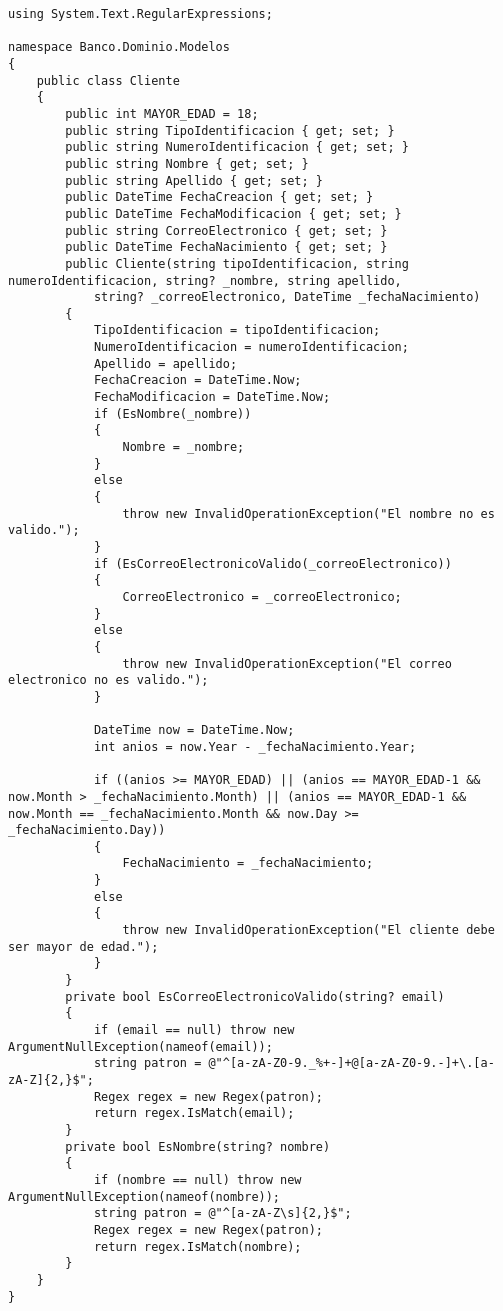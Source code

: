 \documentclass[executivepaper]{article}
\begin{document}
\begin{lstlisting}
using System.Text.RegularExpressions;

namespace Banco.Dominio.Modelos
{
    public class Cliente
    {
        public int MAYOR_EDAD = 18;
        public string TipoIdentificacion { get; set; }
        public string NumeroIdentificacion { get; set; }
        public string Nombre { get; set; }
        public string Apellido { get; set; }
        public DateTime FechaCreacion { get; set; }
        public DateTime FechaModificacion { get; set; }
        public string CorreoElectronico { get; set; }
        public DateTime FechaNacimiento { get; set; }
        public Cliente(string tipoIdentificacion, string numeroIdentificacion, string? _nombre, string apellido,
            string? _correoElectronico, DateTime _fechaNacimiento)
        {
            TipoIdentificacion = tipoIdentificacion;
            NumeroIdentificacion = numeroIdentificacion;
            Apellido = apellido;
            FechaCreacion = DateTime.Now;
            FechaModificacion = DateTime.Now;
            if (EsNombre(_nombre))
            {
                Nombre = _nombre;
            }
            else
            {
                throw new InvalidOperationException("El nombre no es valido.");
            }
            if (EsCorreoElectronicoValido(_correoElectronico))
            {
                CorreoElectronico = _correoElectronico;
            }
            else
            {
                throw new InvalidOperationException("El correo electronico no es valido.");
            }

            DateTime now = DateTime.Now;
            int anios = now.Year - _fechaNacimiento.Year;

            if ((anios >= MAYOR_EDAD) || (anios == MAYOR_EDAD-1 && now.Month > _fechaNacimiento.Month) || (anios == MAYOR_EDAD-1 && now.Month == _fechaNacimiento.Month && now.Day >= _fechaNacimiento.Day))
            {
                FechaNacimiento = _fechaNacimiento;
            }
            else
            {
                throw new InvalidOperationException("El cliente debe ser mayor de edad.");
            }
        }
        private bool EsCorreoElectronicoValido(string? email)
        {
            if (email == null) throw new ArgumentNullException(nameof(email));
            string patron = @"^[a-zA-Z0-9._%+-]+@[a-zA-Z0-9.-]+\.[a-zA-Z]{2,}$";
            Regex regex = new Regex(patron);
            return regex.IsMatch(email);
        }
        private bool EsNombre(string? nombre)
        {
            if (nombre == null) throw new ArgumentNullException(nameof(nombre));
            string patron = @"^[a-zA-Z\s]{2,}$";
            Regex regex = new Regex(patron);
            return regex.IsMatch(nombre);
        }
    }
}
\end{lstlisting}
\end{document}
